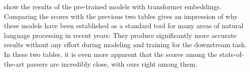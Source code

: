 \documentclass[../../document.tex]{subfiles}
\begin{document}
     show the results of the pre-trained models with transformer embeddings.
    Comparing the scores with the previous two tables gives an impression of why these models have been established as a standard tool for many areas of natural language processing in recent years: They produce significantly more accurate results without any effort during modeling and training for the downstream task.
    In these two tables, it is even more apparent that the scores among the state-of-the-art parsers are incredibly close, with ours right among them.

    \ifSubfilesClassLoaded{%
        \printindex
    }{}
\end{document}
